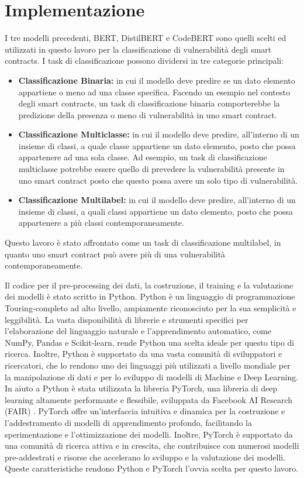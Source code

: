 \documentclass[../../Thesis.tex]{subfiles}
\begin{document}
\section{Implementazione}
I tre modelli precedenti, BERT, DistilBERT e CodeBERT sono quelli scelti ed utilizzati in questo lavoro per la classificazione di vulnerabilità degli smart contracts. I task di classificazione possono dividersi in tre categorie principali: 
\begin{itemize}
    \item \textbf{Classificazione Binaria:} in cui il modello deve predire se un dato elemento appartiene o meno ad una classe specifica. Facendo un esempio nel contesto degli smart contracts, un task di classificazione binaria comporterebbe la predizione della presenza o meno di vulnerabilità in uno smart contract. 
    \item \textbf{Classificazione Multiclasse:} in cui il modello deve predire, all'interno di un insieme di classi, a quale classe appartiene un dato elemento, posto che possa appartenere ad una sola classe. Ad esempio, un task di classificazione multiclasse potrebbe essere quello di prevedere la vulnerabilità presente in uno smart contract posto che questo possa avere un solo tipo di vulnerabilità.
    \item \textbf{Classificazione Multilabel:} in cui il modello deve predire, all'interno di un insieme di classi, a quali classi appartiene un dato elemento, posto che possa appartenere a più classi contemporaneamente. 
\end{itemize}
Questo lavoro è stato affrontato come un task di classificazione multilabel, in quanto uno smart contract può avere più di una vulnerabilità contemporaneamente. 

Il codice per il pre-processing dei dati, la costruzione, il training e la valutazione dei modelli è stato scritto in Python. Python è un linguaggio di programmazione Touring-completo ad alto livello, ampiamente riconosciuto per la sua semplicità e leggibilità. La vasta disponibilità di librerie e strumenti specifici per l'elaborazione del linguaggio naturale e l'apprendimento automatico, come NumPy, Pandas e Scikit-learn, rende Python una scelta ideale per questo tipo di ricerca. Inoltre, Python è supportato da una vasta comunità di sviluppatori e ricercatori, che lo rendono uno dei linguaggi più utilizzati a livello mondiale per la manipolazione di dati e per lo sviluppo di modelli di Machine e Deep Learning. In aiuto a Python è stata utilizzata la libreria PyTorch,  una libreria di deep learning altamente performante e flessibile, sviluppata da Facebook AI Research (FAIR) \cite{Pytorch}. PyTorch offre un'interfaccia intuitiva e dinamica per la costruzione e l'addestramento di modelli di apprendimento profondo, facilitando la sperimentazione e l'ottimizzazione dei modelli. Inoltre, PyTorch è supportato da una comunità di ricerca attiva e in crescita, che contribuisce con numerosi modelli pre-addestrati e risorse che accelerano lo sviluppo e la valutazione dei modelli. Queste caratteristiche rendono Python e PyTorch l'ovvia scelta per questo lavoro.
\end{document}
